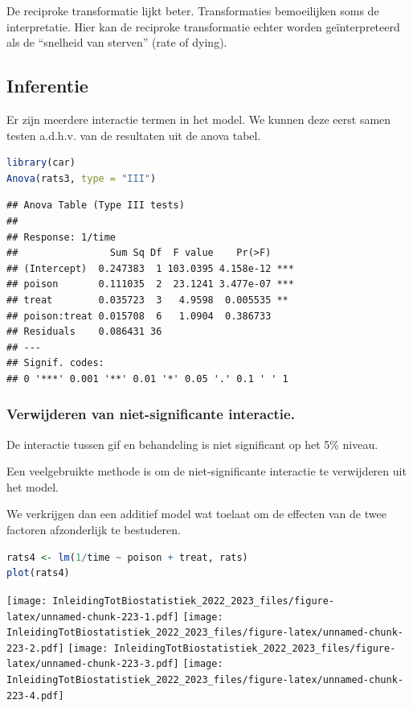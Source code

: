 \documentclass[
  12pt,dutch,coursenotes]{book}
\begin{document}
De reciproke transformatie lijkt beter.
Transformaties bemoeilijken soms de interpretatie.
Hier kan de reciproke transformatie echter worden geïnterpreteerd als de ``snelheid van sterven'' (rate of dying).

\hypertarget{inferentie}{%
\subsection{Inferentie}\label{inferentie}}

Er zijn meerdere interactie termen in het model.
We kunnen deze eerst samen testen a.d.h.v. van de resultaten uit de anova tabel.

\begin{lstlisting}[language=R]
library(car)
Anova(rats3, type = "III")
\end{lstlisting}

\begin{lstlisting}
## Anova Table (Type III tests)
## 
## Response: 1/time
##                Sum Sq Df  F value    Pr(>F)    
## (Intercept)  0.247383  1 103.0395 4.158e-12 ***
## poison       0.111035  2  23.1241 3.477e-07 ***
## treat        0.035723  3   4.9598  0.005535 ** 
## poison:treat 0.015708  6   1.0904  0.386733    
## Residuals    0.086431 36                       
## ---
## Signif. codes:  
## 0 '***' 0.001 '**' 0.01 '*' 0.05 '.' 0.1 ' ' 1
\end{lstlisting}

\hypertarget{verwijderen-van-niet-significante-interactie.}{%
\subsubsection{Verwijderen van niet-significante interactie.}\label{verwijderen-van-niet-significante-interactie.}}

De interactie tussen gif en behandeling is niet significant op het 5\% niveau.

Een veelgebruikte methode is om de niet-significante interactie te verwijderen uit het model.

We verkrijgen dan een additief model wat toelaat om de effecten van de twee factoren afzonderlijk te bestuderen.

\begin{lstlisting}[language=R]
rats4 <- lm(1/time ~ poison + treat, rats)
plot(rats4)
\end{lstlisting}

\texttt{[image: InleidingTotBiostatistiek\_2022\_2023\_files/figure-latex/unnamed-chunk-223-1.pdf]} \texttt{[image: InleidingTotBiostatistiek\_2022\_2023\_files/figure-latex/unnamed-chunk-223-2.pdf]} \texttt{[image: InleidingTotBiostatistiek\_2022\_2023\_files/figure-latex/unnamed-chunk-223-3.pdf]} \texttt{[image: InleidingTotBiostatistiek\_2022\_2023\_files/figure-latex/unnamed-chunk-223-4.pdf]}
\end{document}
